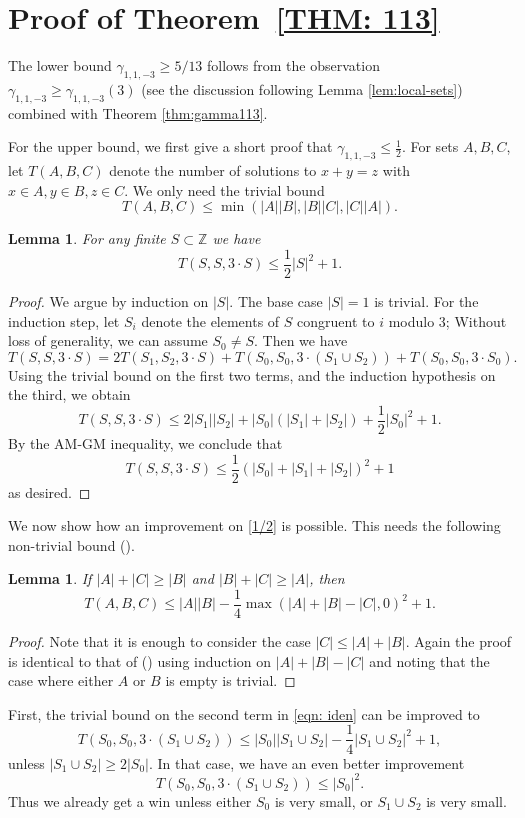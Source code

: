 \documentclass[12pt, notitlepage]{amsart}
\numberwithin{equation}{section}
\newtheorem{lemma}[theorem]{Lemma}
\theoremstyle{remark}
\theoremstyle{definition}
\theoremstyle{remark}
\numberwithin{equation}{section}
\begin{document}
\section{Proof of  Theorem~\ref{THM: 113}}\label{sec:113}

The lower bound $\gamma_{1,1,-3} \geq 5/13$ follows from the observation $\gamma_{1,1,-3} \geq \gamma_{1,1,-3}(3)$ (see the discussion following Lemma \ref{lem:local-sets}) combined with Theorem \ref{thm:gamma113}.

For the upper bound, we first give a short proof that $\gamma_{1,1,-3} \leq \frac{1}{2}$. For sets $A, B, C$, let $T(A, B, C)$ denote the number of solutions to $x + y = z$ with $x \in A, y \in B, z \in C$. We only need the trivial bound
$$T(A, B, C) \leq \min(|A||B|, |B||C|, |C||A|).$$
\begin{lemma}
    \label{lem:half-bound}
  For any finite $S\subset \mathbb{Z}$ we have
    \begin{equation}\label{1/2}
  T(S, S, 3 \cdot S) \leq \frac{1}{2} |S|^2 + 1.      
    \end{equation}  
\end{lemma}
\begin{proof}
    We argue by induction on $|S|$. The base case $|S| = 1$ is trivial. For the induction step, let $S_i$ denote the elements of $S$ congruent to $i$ modulo $3$; Without loss of generality, we can assume $S_0 \neq S$. Then we have
\begin{equation}\label{eqn: iden}
   T(S, S, 3 \cdot S) = 2 T(S_1, S_2, 3 \cdot S) + T(S_0, S_0, 3 \cdot (S_1 \cup S_2)) + T(S_0, S_0, 3 \cdot S_0). 
\end{equation}    
    Using the trivial bound on the first two terms, and the induction hypothesis on the third, we obtain
    $$T(S, S, 3 \cdot S) \leq 2 |S_1| |S_2| + |S_0|(|S_1| + |S_2|) + \frac{1}{2} |S_0|^2 + 1.$$
    By the AM-GM inequality, we conclude that 
    $$T(S, S, 3 \cdot S) \leq \frac{1}{2} (|S_0| + |S_1| + |S_2|)^2 + 1$$
    as desired.
\end{proof}
We now show how an improvement on \eqref{1/2} is possible. This needs the following non-trivial bound (\cite[Lemma 2]{lev2014solving}).
\begin{lemma}
    If $|A| + |C| \geq |B|$ and $|B| + |C| \geq |A|$, then
    \label{lemma ABC}
    $$T(A, B, C) \leq |A||B| - \frac{1}{4} \max(|A| + |B| - |C|, 0)^2 + 1.$$
\end{lemma}
\begin{proof}
    Note that it is enough to consider the case $|C|\le |A|+|B|$. Again the proof is identical to that of (\cite[Lemma 2]{lev2014solving}) using induction on $|A|+|B|-|C|$ and noting that the case where either $A$ or $B$ is empty is trivial.
\end{proof}
First, the trivial bound on the second term in \eqref{eqn: iden} can be improved to
$$T(S_0, S_0, 3 \cdot (S_1 \cup S_2)) \leq |S_0| |S_1 \cup S_2| - \frac{1}{4} |S_1 \cup S_2|^2+1,$$
unless $|S_1 \cup S_2| \geq 2 |S_0|$. In that case, we have an even better improvement
$$T(S_0, S_0, 3 \cdot (S_1 \cup S_2)) \leq |S_0|^2.$$
Thus we already get a win unless either $S_0$ is very small, or $S_1 \cup S_2$ is very small. 
\end{document}
